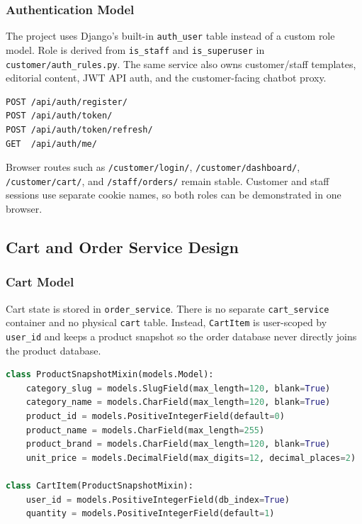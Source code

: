 \documentclass[12pt,a4paper]{article}
\newcommand{\codepath}[1]{{\small\texttt{#1}}}
\begin{document}
\subsubsection{Authentication Model}

The project uses Django's built-in \codepath{auth\_user} table instead of a custom role model. Role is derived from \codepath{is\_staff} and \codepath{is\_superuser} in \codepath{customer/auth\_rules.py}. The same service also owns customer/staff templates, editorial content, JWT API auth, and the customer-facing chatbot proxy.

\begin{lstlisting}[caption={JWT auth API in user\_service.}]
POST /api/auth/register/
POST /api/auth/token/
POST /api/auth/token/refresh/
GET  /api/auth/me/
\end{lstlisting}

Browser routes such as \codepath{/customer/login/}, \codepath{/customer/dashboard/}, \codepath{/customer/cart/}, and \codepath{/staff/orders/} remain stable. Customer and staff sessions use separate cookie names, so both roles can be demonstrated in one browser.

\subsection{Cart and Order Service Design}

\subsubsection{Cart Model}

Cart state is stored in \codepath{order\_service}. There is no separate \codepath{cart\_service} container and no physical \codepath{cart} table. Instead, \codepath{CartItem} is user-scoped by \codepath{user\_id} and keeps a product snapshot so the order database never directly joins the product database.

\begin{lstlisting}[language=Python,caption={Real cart and snapshot model excerpt.}]
class ProductSnapshotMixin(models.Model):
    category_slug = models.SlugField(max_length=120, blank=True)
    category_name = models.CharField(max_length=120, blank=True)
    product_id = models.PositiveIntegerField(default=0)
    product_name = models.CharField(max_length=255)
    product_brand = models.CharField(max_length=120, blank=True)
    unit_price = models.DecimalField(max_digits=12, decimal_places=2)

class CartItem(ProductSnapshotMixin):
    user_id = models.PositiveIntegerField(db_index=True)
    quantity = models.PositiveIntegerField(default=1)
\end{lstlisting}
\end{document}
